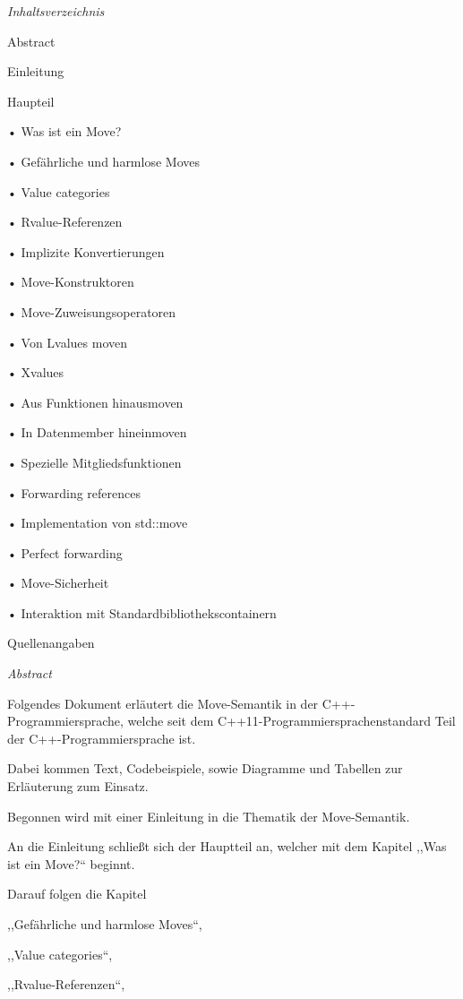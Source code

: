 \documentclass{article}
\begin{document}
\baselineskip=12pt
\emph{Inhaltsverzeichnis}

\vspace{12pt}
Abstract

\vspace{12pt}
Einleitung

\vspace{12pt}
Haupteil

• Was ist ein Move?

• Gefährliche und harmlose Moves

• Value categories

• Rvalue-Referenzen

• Implizite Konvertierungen

• Move-Konstruktoren

• Move-Zuweisungsoperatoren

• Von Lvalues moven

• Xvalues

• Aus Funktionen hinausmoven

• In Datenmember hineinmoven

• Spezielle Mitgliedsfunktionen

• Forwarding references

• Implementation von std::move

• Perfect forwarding

• Move-Sicherheit

• Interaktion mit Standardbibliothekscontainern

\vspace{12pt}
Quellenangaben

\vspace{129pt}
\emph{Abstract }

Folgendes Dokument erläutert die Move-Semantik in der C++-Programmiersprache, 
welche seit dem C++11-Programmiersprachenstandard Teil der C++-Programmiersprache 
ist.

Dabei kommen Text, Codebeispiele, sowie Diagramme und Tabellen zur Erläuterung 
zum Einsatz.

Begonnen wird mit einer Einleitung in die Thematik der Move-Semantik.

An die Einleitung schließt sich der Hauptteil an, welcher mit dem Kapitel ,,Was 
ist ein Move?`` beginnt.

Darauf folgen die Kapitel 

,,Gefährliche und harmlose Moves``,

,,Value categories``,

,,Rvalue-Referenzen``,
\end{document}
